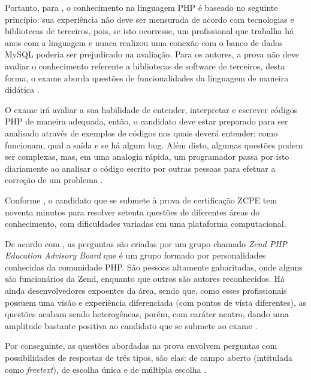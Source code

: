 Portanto, para , o
conhecimento na linguagem \acs{PHP} é baseado no seguinte princípio: sua
experiência não deve ser mensurada de acordo com tecnologias
e bibliotecas de terceiros, pois, se isto ocorresse, um profissional que
trabalha há anos com a linguagem e nunca realizou uma conexão com o banco de
dados \acs{MySQL} poderia ser prejudicado na avaliação. Para os autores, a
prova não deve avaliar o conhecimento referente a bibliotecas de software
de terceiros, desta forma, o exame aborda questões de funcionalidades da
linguagem  de maneira didática \cite{theZendPHPCertificationPracticeTestBook}.

O exame irá avaliar a sua habilidade de
entender, interpretar e escrever códigos \acs{PHP} de maneira adequada, então,
o candidato deve estar preparado para ser analisado através de exemplos de
códigos nos quais deverá entender: como funcionam, qual a saída e se há algum
\acs{bug}. Além disto, algumas questões podem ser complexas, mas, em uma analogia rápida,
um programador passa por isto diariamente ao analisar o código escrito por
outras pessoas para efetuar a correção de um problema
\cite{theZendPHPCertificationPracticeTestBook}.

Conforme , o candidato que
se submete à prova de certificação \acs{ZCPE} tem noventa minutos para resolver
setenta questões de diferentes áreas do conhecimento, com dificuldades variadas
em uma plataforma computacional.

De acordo com , as perguntas são criadas por
um grupo chamado \textit{Zend PHP Education Advisory Board} que é um grupo formado por
personalidades conhecidas da comunidade \acs{PHP}. São pessoas altamente
gabaritadas, onde alguns são funcionários da \acs{Zend}, enquanto que outros são autores
reconhecidos. Há ainda desenvolvedores expoentes da área, sendo que, como esses
profissionais possuem uma visão e experiência diferenciada (com pontos de
vista diferentes), as questões acabam sendo heterogêneas, porém, com caráter
neutro, dando uma amplitude bastante positiva ao candidato que se submete ao exame
\cite{entrevistaAriZCEBrasil}.

Por conseguinte, as questões abordadas na prova envolvem perguntas com
possibilidades de respostas de três tipos, são elas: de campo aberto (intitulada
como \textit{freetext}), de escolha única e de múltipla escolha
\cite{entrevistaAriZCEBrasil}.

